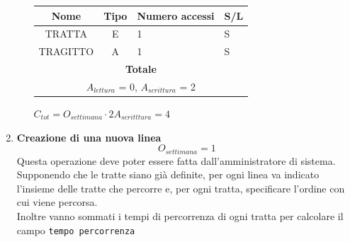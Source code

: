\documentclass[12pt,a4paper]{report}
\begin{document}
\begin{enumerate}[label=\textbf{\arabic*)}]
\begin{itemize}
\begin{center}
    \end{center}
    \begin{table}[H]
    \centering
    \begin{tabular}{|c|c|l|l|}
    \hline
    \textbf{Nome} & \textbf{Tipo} & \textbf{Numero accessi} & \textbf{S/L} \\
    \hline
    TRATTA & E & 1 & S \\
    \hline
    TRAGITTO & A & 1 & S \\
    \hline
    \multicolumn{4}{c}{\textbf{Totale}} \\
    \multicolumn{4}{c}{${A_{lettura}}$ = 0, ${A_{scrittura}}$ = 2} \\
    \hline
    \end{tabular}
    \end{table}
    \begin{center}
    ${C_{tot} = {O_{settimana}}\cdot{2A_{scritttura}}= 4}$
    \end{center}
    \end{itemize}



    \item\textbf{Creazione di una nuova linea} \label{op21} \\
	\[{O_{settimana} = 1}\]
	Questa operazione deve poter essere fatta dall'amministratore di sistema.\\
	Supponendo che le tratte siano già definite, per ogni linea va indicato l'insieme delle tratte che percorre e, per ogni tratta, specificare l'ordine con cui viene percorsa.\\
	Inoltre vanno sommati i tempi di percorrenza di ogni tratta per calcolare il campo \texttt{tempo percorrenza}


\end{enumerate}
\end{document}
